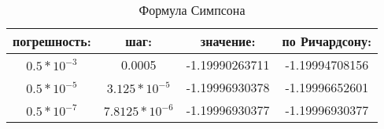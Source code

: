 \documentclass{article}
\begin{document}
\begin{table}[H]
\caption{Формула Симпсона}
\label{tabular:timesandtenses}
\begin{center}
\begin{tabular}{|c|c|c|c|} \hline
погрешность: & шаг: & значение: & по Ричардсону: \\ \hline
$0.5*10^{-3}$ & 0.0005 & -1.19990263711 & -1.19994708156 \\
$0.5*10^{-5}$ & $3.125*10^{-5}$ & -1.19996930378 & -1.19996652601 \\
$0.5*10^{-7}$ & $7.8125*10^{-6}$ & -1.19996930377 & -1.19996930377 \\ \hline
\end{tabular}
\end{center}
\end{table}
\end{document}
